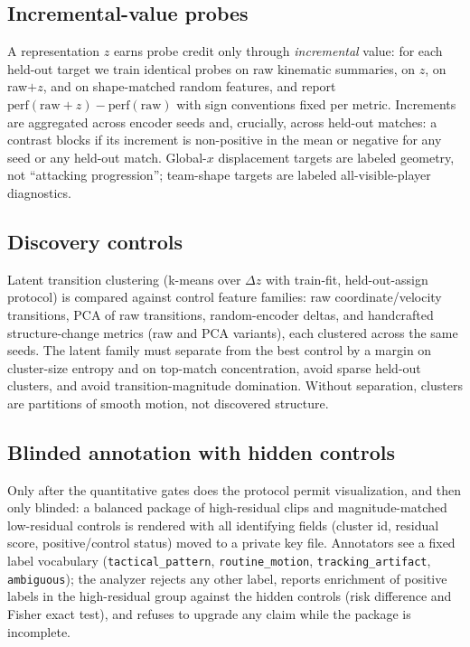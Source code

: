 \documentclass{article}
\begin{document}
\subsection{Incremental-value probes}
\label{sec:protocol-probes}

A representation $z$ earns probe credit only through \emph{incremental} value:
for each held-out target we train identical probes on raw kinematic summaries,
on $z$, on raw$+z$, and on shape-matched random features, and report
$\mathrm{perf}(\mathrm{raw}{+}z) - \mathrm{perf}(\mathrm{raw})$ with sign
conventions fixed per metric. Increments are aggregated across \NumSeeds{}
encoder seeds and, crucially, across held-out matches: a contrast blocks if
its increment is non-positive in the mean or negative for any seed or any
held-out match. Global-$x$ displacement targets are labeled geometry, not
``attacking progression''; team-shape targets are labeled all-visible-player
diagnostics.

\subsection{Discovery controls}
\label{sec:protocol-discovery}

Latent transition clustering (k-means over $\Delta z$ with train-fit,
held-out-assign protocol) is compared against \DiscoveryFamilyCount{} control
feature families: raw coordinate/velocity transitions, PCA of raw transitions,
random-encoder deltas, and handcrafted structure-change metrics (raw and PCA
variants), each clustered across the same seeds. The latent family must
separate from the best control by a margin on cluster-size entropy and on
top-match concentration, avoid sparse held-out clusters, and avoid
transition-magnitude domination. Without separation, clusters are partitions
of smooth motion, not discovered structure.

\subsection{Blinded annotation with hidden controls}
\label{sec:protocol-annotation}

Only after the quantitative gates does the protocol permit visualization, and
then only blinded: a balanced package of \PanelPositiveRows{} high-residual
clips and \PanelControlRows{} magnitude-matched low-residual controls is
rendered with all identifying fields (cluster id, residual score,
positive/control status) moved to a private key file. Annotators see a fixed
label vocabulary (\texttt{tactical\_pattern}, \texttt{routine\_motion},
\texttt{tracking\_artifact}, \texttt{ambiguous}); the analyzer rejects any
other label, reports enrichment of positive labels in the high-residual group
against the hidden controls (risk difference and Fisher exact test), and
refuses to upgrade any claim while the package is incomplete.
\end{document}
